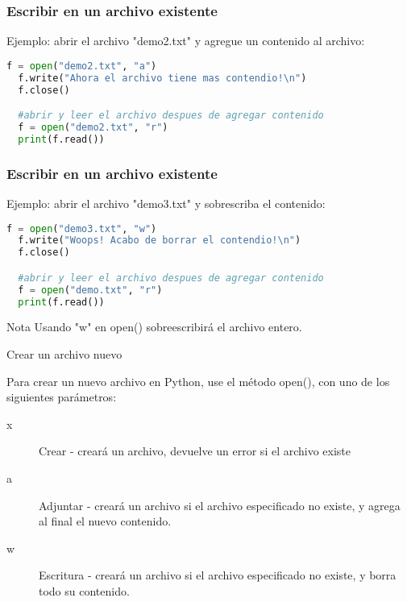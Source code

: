 \begin{frame}[fragile]
  \frametitle{Escribir en un archivo existente}

  Ejemplo: abrir el archivo "demo2.txt" y agregue un
  contenido al archivo: 

  \vspace{\baselineskip}
  \begin{lstlisting}[language=Python]
  f = open("demo2.txt", "a")
  f.write("Ahora el archivo tiene mas contendio!\n")
  f.close()

  #abrir y leer el archivo despues de agregar contenido
  f = open("demo2.txt", "r")
  print(f.read()) 
  \end{lstlisting}
\end{frame}

\begin{frame}[fragile]
  \frametitle{Escribir en un archivo existente}

  Ejemplo: abrir el archivo "demo3.txt" y sobrescriba el
  contenido: 

  \vspace{\baselineskip}
  \begin{lstlisting}[language=Python]
  f = open("demo3.txt", "w")
  f.write("Woops! Acabo de borrar el contendio!\n")
  f.close()

  #abrir y leer el archivo despues de agregar contenido
  f = open("demo.txt", "r")
  print(f.read())
  \end{lstlisting}

  \vspace{\baselineskip}
  \begin{alertblock}{Nota}
    Usando "w" en open() sobreescribirá el archivo entero.
  \end{alertblock}
\end{frame}


\begin{frame}[c]{Crear un archivo nuevo}

  Para crear un nuevo archivo en Python, use el método
  \textcolor{codeKeyword}{open}(),
  con uno de los siguientes parámetros:

  \vspace{\baselineskip}
  \begin{description}
    \item[x] Crear - creará un archivo, devuelve un error si el archivo existe
    \pausa
    \item[a] Adjuntar - creará un archivo si el archivo especificado no
      existe, y agrega al final el nuevo contenido.
    \pausa
    \item[w] Escritura - creará un archivo si el archivo especificado no
      existe, y borra todo su contenido.
  \end{description}
\end{frame}

